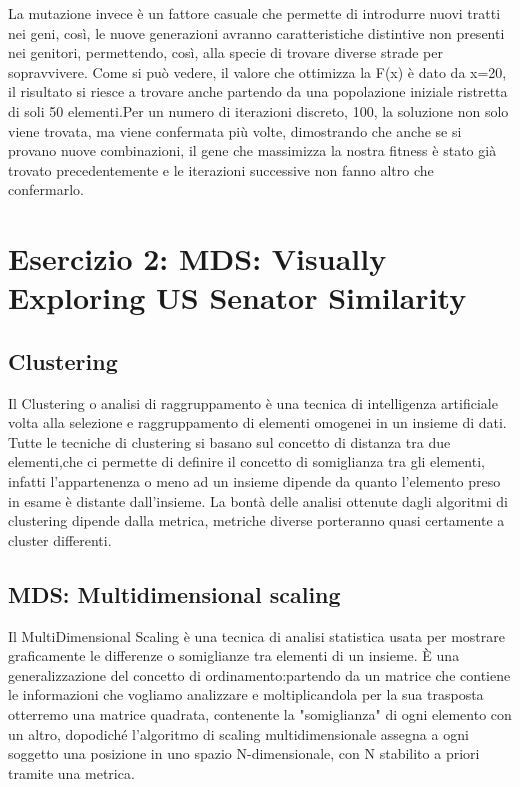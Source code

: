 			La mutazione invece è un fattore casuale che permette di introdurre nuovi tratti nei geni, così, le nuove generazioni avranno caratteristiche distintive non presenti nei genitori, permettendo, così, alla specie di trovare diverse strade per sopravvivere.
			Come si può vedere, il valore che ottimizza la F(x) è dato da x=20, il risultato si riesce a trovare anche partendo da una popolazione iniziale ristretta di soli 50 elementi.Per un numero di iterazioni discreto, 100, la soluzione non solo viene trovata, ma viene confermata più volte, dimostrando che anche se si provano nuove combinazioni, il gene che massimizza la nostra fitness è stato già trovato precedentemente e le iterazioni successive non fanno altro che confermarlo.
	\section{Esercizio 2: MDS: Visually Exploring US Senator Similarity}
		\label{sec:es2}
			\subsection{Clustering}
				Il Clustering o analisi di raggruppamento è una tecnica di intelligenza artificiale volta alla selezione e raggruppamento di elementi omogenei in un insieme di dati. Tutte le tecniche di clustering si basano sul concetto di distanza tra due elementi,che ci permette di definire il concetto di somiglianza tra gli elementi, infatti l'appartenenza o meno ad un insieme dipende da quanto l'elemento preso in esame è distante dall'insieme. La bontà delle analisi ottenute dagli algoritmi di clustering dipende dalla metrica, metriche diverse porteranno quasi certamente a cluster differenti.
				
			\subsection{MDS: Multidimensional scaling}
				Il MultiDimensional Scaling è una tecnica di analisi statistica usata per mostrare graficamente le differenze o somiglianze tra elementi di un insieme. È una generalizzazione del concetto di ordinamento:partendo da un matrice che contiene le informazioni che vogliamo analizzare e moltiplicandola per la sua trasposta otterremo una matrice quadrata, contenente la "somiglianza"  di ogni elemento con un altro, dopodiché l'algoritmo di scaling multidimensionale assegna a ogni soggetto una posizione in uno spazio N-dimensionale, con N stabilito a priori tramite una metrica.\par
